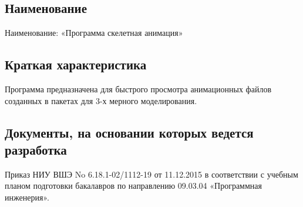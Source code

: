 \subsection{Наименование}
Наименование: «Программа скелетная анимация»

\subsection{Краткая характеристика}
Программа предназначена для быстрого просмотра анимационных файлов созданных в пакетах для 3-х мерного моделирования.

\subsection{Документы, на основании которых ведется разработка}
Приказ НИУ ВШЭ No 6.18.1-02/1112-19 от 11.12.2015 в соответствии с учебным планом
подготовки бакалавров по направлению 09.03.04 «Программная инженерия».